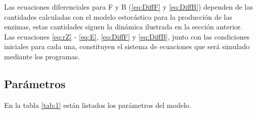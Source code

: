 \documentclass[12pt]{article}
\begin{document}
Las ecuaciones diferenciales para F y B (\ref{eq:DiffF} y \ref{eq:DiffB}) dependen de las cantidades calculadas con el modelo estoc\'astico para la producci\'on de las enzimas, estas cantidades siguen la din\'amica ilustrada en la secci\'on anterior.\\

Las ecuaciones \ref{eq:rZ} - \ref{eq:E}, \ref{eq:DiffF} y \ref{eq:DiffB}, junto con las condiciones iniciales para cada una, constituyen el sistema de ecuaciones que ser\'a simulado mediante los programas.

\subsection{Par\'ametros}

En la tabla \ref{tab:1} est\'an listados los par\'ametros del modelo.
\end{document}
